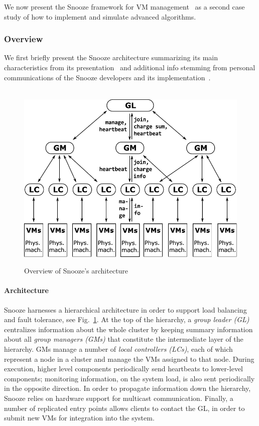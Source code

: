 
We now present the Snooze framework for VM
management~\cite{feller:ccgrid12} as a second case study of how
to implement and simulate advanced algorithms.

\subsubsection{Overview}

We first briefly present the Snooze architecture summarizing its main
characteristics from its presentation~\cite{feller:ccgrid12} and
additional info stemming from personal communications of the Snooze
developers and its implementation~\cite{snoozedev14,snoozeweb}.
\begin{figure}
  {\centering ~\includegraphics[width=.95\linewidth]{figures/snoozearch.pdf}}
  \caption{Overview of Snooze's architecture}
  \label{fig:snoozearch}
\end{figure}

\paragraph{Architecture}

Snooze harnesses a hierarchical architecture in order to support load
balancing and fault tolerance, see Fig.~\ref{fig:snoozearch}. At the
top of the hierarchy, a \emph{group leader (GL)} centralizes
information about the whole cluster by keeping summary information
about all \emph{group managers (GMs)} that constitute the intermediate
layer of the hierarchy. GMs manage a number of \emph{local controllers
  (LCs)}, each of which represent a node in a cluster and manage the
VMs assigned to that node. During execution, higher level components
periodically send heartbeats to lower-level components; monitoring
information, \eg on the system load, is also sent periodically in the
opposite direction. In order to propagate information down the
hierarchy, Snooze relies on hardware support for multicast
communication. Finally, a number of replicated entry points allows
clients to contact the GL, \eg in order to submit new VMs for
integration into the system.

